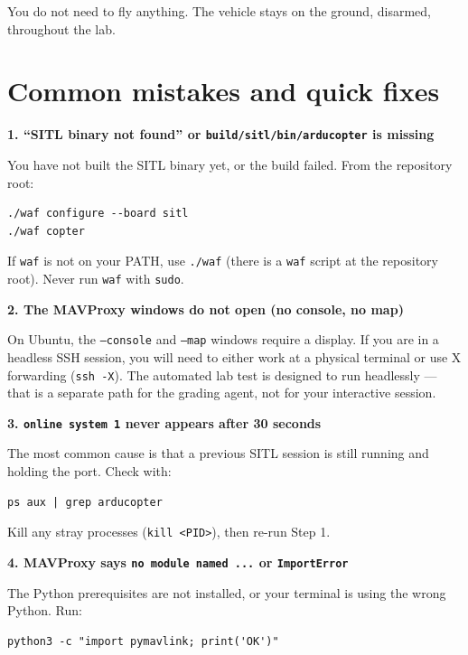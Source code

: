 \documentclass[a4paper,11pt,twoside]{article}
\begin{document}
You do not need to fly anything. The vehicle stays on the ground, disarmed, throughout the lab.

\section*{Common mistakes and quick fixes}

\textbf{1. ``SITL binary not found'' or \texttt{build/sitl/bin/arducopter} is missing}

You have not built the SITL binary yet, or the build failed. From the repository root:

\begin{Verbatim}[frame=single,fontsize=\small]
./waf configure --board sitl
./waf copter
\end{Verbatim}

If \texttt{waf} is not on your PATH, use \texttt{./waf} (there is a \texttt{waf} script at the repository root). Never run \texttt{waf} with \texttt{sudo}.

\textbf{2. The MAVProxy windows do not open (no console, no map)}

On Ubuntu, the \texttt{--console} and \texttt{--map} windows require a display. If you are in a headless SSH session, you will need to either work at a physical terminal or use X forwarding (\texttt{ssh -X}). The automated lab test is designed to run headlessly --- that is a separate path for the grading agent, not for your interactive session.

\textbf{3. \texttt{online system 1} never appears after 30 seconds}

The most common cause is that a previous SITL session is still running and holding the port. Check with:

\begin{Verbatim}[frame=single,fontsize=\small]
ps aux | grep arducopter
\end{Verbatim}

Kill any stray processes (\texttt{kill <PID>}), then re-run Step 1.

\textbf{4. MAVProxy says \texttt{no module named ...} or \texttt{ImportError}}

The Python prerequisites are not installed, or your terminal is using the wrong Python. Run:

\begin{Verbatim}[frame=single,fontsize=\small]
python3 -c "import pymavlink; print('OK')"
\end{Verbatim}
\end{document}
